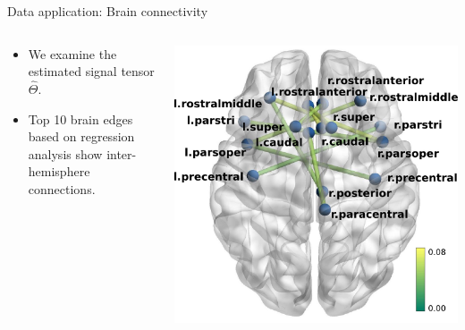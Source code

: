 \documentclass[10pt, mathserif]{beamer} %
\theoremstyle{definition}
\theoremstyle{plain}
\begin{document}
\begin{frame}{Data application: Brain connectivity}
\begin{columns}
\begin{column}{0.6\textwidth}
 \begin{itemize}
     \item We examine the estimated signal tensor $\hat\Theta.$
     \item Top 10 brain edges based on regression analysis show inter-hemisphere connections.
 \end{itemize}
\end{column}
\begin{column}{0.4\textwidth} 
   \begin{center}
     \includegraphics[width=\textwidth]{Figures/brainIQ.pdf}
     \end{center}
\end{column}
\end{columns}

\end{frame}
\end{document}
